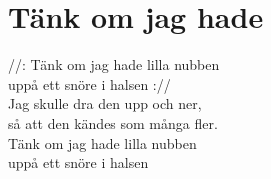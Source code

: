 \section{Tänk om jag hade}
//: Tänk om jag hade lilla nubben\\
uppå ett snöre i halsen ://\\
Jag skulle dra den upp och ner,\\
så att den kändes som många fler.\\
Tänk om jag hade lilla nubben\\
uppå ett snöre i halsen\\